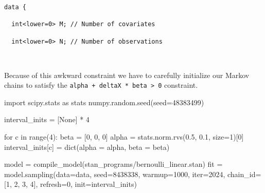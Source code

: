 \documentclass[
  letterpaper,
  DIV=11,
  numbers=noendperiod]{scrartcl}
\newenvironment{Shaded}{\begin{snugshade}}{\end{snugshade}}
\newcommand{\BuiltInTok}[1]{\textcolor[rgb]{0.00,0.23,0.31}{#1}}
\newcommand{\ControlFlowTok}[1]{\textcolor[rgb]{0.00,0.23,0.31}{#1}}
\newcommand{\DecValTok}[1]{\textcolor[rgb]{0.68,0.00,0.00}{#1}}
\newcommand{\FloatTok}[1]{\textcolor[rgb]{0.68,0.00,0.00}{#1}}
\newcommand{\ImportTok}[1]{\textcolor[rgb]{0.00,0.46,0.62}{#1}}
\newcommand{\KeywordTok}[1]{\textcolor[rgb]{0.00,0.23,0.31}{#1}}
\newcommand{\NormalTok}[1]{\textcolor[rgb]{0.00,0.23,0.31}{#1}}
\newcommand{\OperatorTok}[1]{\textcolor[rgb]{0.37,0.37,0.37}{#1}}
\newcommand{\StringTok}[1]{\textcolor[rgb]{0.13,0.47,0.30}{#1}}
\newcommand{\VariableTok}[1]{\textcolor[rgb]{0.07,0.07,0.07}{#1}}
\begin{document}
\begin{verbatim}
data {

  int<lower=0> M; // Number of covariates

  int<lower=0> N; // Number of observations

  
\end{verbatim}

Because of this awkward constraint we have to carefully initialize our
Markov chains to satisfy the
\texttt{alpha\ +\ deltaX\ *\ beta\ \textgreater{}\ 0} constraint.

\begin{Shaded}
\begin{Highlighting}[]
\ImportTok{import}\NormalTok{ scipy.stats }\ImportTok{as}\NormalTok{ stats}
\NormalTok{numpy.random.seed(seed}\OperatorTok{=}\DecValTok{48383499}\NormalTok{)}

\NormalTok{interval\_inits }\OperatorTok{=}\NormalTok{ [}\VariableTok{None}\NormalTok{] }\OperatorTok{*} \DecValTok{4}

\ControlFlowTok{for}\NormalTok{ c }\KeywordTok{in} \BuiltInTok{range}\NormalTok{(}\DecValTok{4}\NormalTok{):}
\NormalTok{  beta }\OperatorTok{=}\NormalTok{ [}\DecValTok{0}\NormalTok{, }\DecValTok{0}\NormalTok{, }\DecValTok{0}\NormalTok{]}
\NormalTok{  alpha }\OperatorTok{=}\NormalTok{ stats.norm.rvs(}\FloatTok{0.5}\NormalTok{, }\FloatTok{0.1}\NormalTok{, size}\OperatorTok{=}\DecValTok{1}\NormalTok{)[}\DecValTok{0}\NormalTok{]}
\NormalTok{  interval\_inits[c] }\OperatorTok{=} \BuiltInTok{dict}\NormalTok{(alpha }\OperatorTok{=}\NormalTok{ alpha, beta }\OperatorTok{=}\NormalTok{ beta)}
\end{Highlighting}
\end{Shaded}

\begin{Shaded}
\begin{Highlighting}[]
\NormalTok{model }\OperatorTok{=}\NormalTok{ compile\_model(}\StringTok{\textquotesingle{}stan\_programs/bernoulli\_linear.stan\textquotesingle{}}\NormalTok{)}
\NormalTok{fit }\OperatorTok{=}\NormalTok{ model.sampling(data}\OperatorTok{=}\NormalTok{data, seed}\OperatorTok{=}\DecValTok{8438338}\NormalTok{, warmup}\OperatorTok{=}\DecValTok{1000}\NormalTok{, }\BuiltInTok{iter}\OperatorTok{=}\DecValTok{2024}\NormalTok{,}
\NormalTok{                     chain\_id}\OperatorTok{=}\NormalTok{[}\DecValTok{1}\NormalTok{, }\DecValTok{2}\NormalTok{, }\DecValTok{3}\NormalTok{, }\DecValTok{4}\NormalTok{], refresh}\OperatorTok{=}\DecValTok{0}\NormalTok{, init}\OperatorTok{=}\NormalTok{interval\_inits)}
\end{Highlighting}
\end{Shaded}
\end{document}
